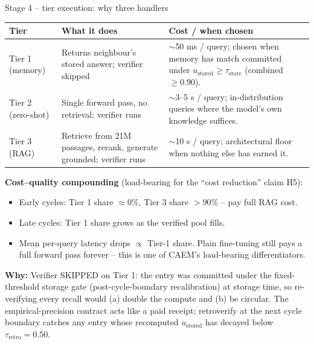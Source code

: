 \documentclass[10pt,aspectratio=169]{beamer}
\newcommand{\why}[1]{{\color{caemamber}\textbf{Why:}} #1}
\begin{document}
\begin{frame}{Stage 4 -- tier execution: why three handlers}
  \scriptsize
  \begin{tabular}{@{}p{1.7cm}p{4.2cm}p{6.5cm}@{}}
    \toprule
    \textbf{Tier} & \textbf{What it does} & \textbf{Cost / when chosen} \\
    \midrule
    Tier 1 (memory) & Returns neighbour's stored answer; verifier skipped & $\sim$50 ms / query;
                    chosen when memory has match committed under $u_{\text{stored}}\ge\tau_{\text{store}}$ (combined $\ge 0.90$). \\
    Tier 2 (zero-shot) & Single forward pass, no retrieval; verifier runs & $\sim$3--5 s / query;
                    in-distribution queries where the model's own knowledge suffices. \\
    Tier 3 (RAG) & Retrieve from 21M passages, rerank, generate grounded; verifier runs & $\sim$10 s / query;
                    architectural floor when nothing else has earned it. \\
    \bottomrule
  \end{tabular}

  \vspace{0.5em}
  \textbf{Cost--quality compounding} (load-bearing for the ``cost reduction'' claim H5):
  \begin{itemize}\scriptsize
    \item Early cycles: Tier 1 share $\approx 0$\%, Tier 3 share $> 90$\% -- pay full RAG cost.
    \item Late cycles: Tier 1 share grows as the verified pool fills.
    \item Mean per-query latency drops $\propto$ Tier-1 share. Plain fine-tuning still pays a full forward pass forever -- this is one of CAEM's load-bearing differentiators.
  \end{itemize}

  \why{Verifier SKIPPED on Tier 1: the entry was committed under the fixed-threshold storage gate (post-cycle-boundary recalibration) at storage time, so re-verifying every recall would (a) double the compute and (b) be circular. The empirical-precision contract acts like a paid receipt; retroverify at the next cycle boundary catches any entry whose recomputed $u_{\text{stored}}$ has decayed below $\tau_{\text{retro}}{=}0.50$.}
\end{frame}
\end{document}
